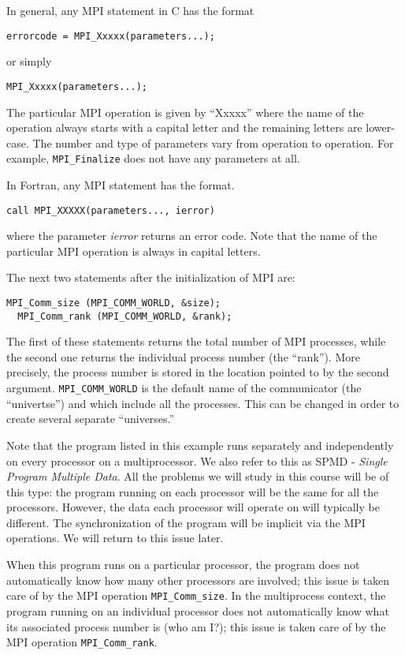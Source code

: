 In general, any MPI statement in C has the format
\begin{lstlisting}[style=c]
  errorcode = MPI_Xxxxx(parameters...);
\end{lstlisting}
or simply
\begin{lstlisting}[style=c]
  MPI_Xxxxx(parameters...);
\end{lstlisting}
The particular MPI operation is given by ``Xxxxx'' where the name of the operation
always starts with a capital letter and the remaining letters are lower-case.
The number and type of parameters vary from operation to operation. For example,
\texttt{MPI\_Finalize} does not have any parameters at all.

In Fortran, any MPI statement has the format.
\begin{lstlisting}[style=c]
  call MPI_XXXXX(parameters..., ierror)
\end{lstlisting}
where the parameter \emph{ierror} returns an error code. Note that the name of
the particular MPI operation is always in capital letters.

The next two statements after the initialization of MPI are:
\begin{lstlisting}[style=c]
  MPI_Comm_size (MPI_COMM_WORLD, &size);
  MPI_Comm_rank (MPI_COMM_WORLD, &rank);
\end{lstlisting}
The first of these statements returns the total number of MPI processes, while
the second one returns the individual process number (the ``rank''). More
precisely, the process number is stored in the location pointed to by the second
argument. \texttt{MPI\_COMM\_WORLD} is the default name of the communicator (the
``univertse'') and which include all the processes. This can be changed in order
to create several separate ``universes.''

Note that the program listed in this example runs separately and independently
on every processor on a multiprocessor. We also refer to this as SPMD -
\emph{Single Program Multiple Data}. All the problems we will study in this
course will be of this type: the program running on each processor will be the
same for all the processors. However, the data each processor will operate on
will typically be different. The synchronization of the program will be implicit
via the MPI operations. We will return to this issue later.

When this program runs on a particular processor, the program does not
automatically know how many other processors are involved; this issue is taken
care of by the MPI operation \texttt{MPI\_Comm\_size}. In the multiprocess
context, the program running on an individual processor does not automatically
know what its associated process number is (who am I?); this issue is taken care
of by the MPI operation \texttt{MPI\_Comm\_rank}.

